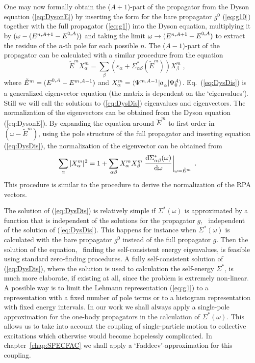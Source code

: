 One may now formally obtain the ($A+1$)-part of the propagator from the Dyson 
equation (\ref{eq:DysonE}) by
inserting the form for the bare propagator $g^0$ (\ref{eq:g10}) together with
the full
propagator (\ref{eq:g1}) into the Dyson equation, multiplying it by
$(\omega - (E^{n,A+1}- \EnulA))$ and taking the limit 
$\omega \rightarrow (E^{n,A+1}- \EnulA)$ to extract the residue of the $n$-th
pole for each possible $n$.
The ($A-1$)-part of the propagator can be calculated with a similar procedure
from the equation
%
	\begin{equation}
		\tilde{E}^m  
		X_\alpha^m
	=
		\sum_\beta
		\left(
			\varepsilon_\alpha +
			\Sigma^\ast_{\alpha\beta}(\tilde{E}^m)
		\right)
		X_\beta^m
	\label{eq:DysDis}
	\;,
	\end{equation}
%
where $\tilde{E}^m = (\EnulA - E^{m,A-1})$ and 
$X_\alpha^m=\ME<\Psi^{m,A-1}| \Oa{\alpha} | \Psi^A_0 >$. 
Eq.~(\ref{eq:DysDis}) is a generalized eigenvector equation 
(the matrix is dependent on the `eigenvalues'). Still we will call the 
solutions to (\ref{eq:DysDis}) eigenvalues and eigenvectors.
The normalization of the eigenvectors can be obtained from the Dyson
equation (\ref{eq:DysonE}). By expanding
the equation  around $\tilde{E}^m$ to first
order in $(\omega-\tilde{E}^m)$, using the pole structure of the full 
propagator and  inserting equation (\ref{eq:DysDis}), the normalization of
the eigenvector can be obtained from
%
	\begin{equation}
		\sum_\alpha
		|X_\alpha^m| ^2
	=
		1 
	+
		\sum_{\alpha\beta}
		X_\alpha^m
		X_\beta^m
		\left.
			\frac{ {\rm d} \Sigma^\ast_{\alpha\beta}(\omega)}
			     { {\rm d} \omega}
		\right|_{\omega = \tilde{E}^m}
	\label{eq:DysNorm}
	\;.
	\end{equation}
%
This procedure is similar to the procedure to derive the normalization of the
RPA vectors\cite{AEG93,HDA86}.

The solution of (\ref{eq:DysDis}) is relatively simple if 
$\Sigma^\ast(\omega)$ is approximated by a function that is independent of 
the solutions for the propagator $g$, \ie\ independent of the solution of
(\ref{eq:DysDis}). This happens for instance when 
$\Sigma^\ast(\omega)$ is calculated with the bare propagator $g^0$ instead of 
the 
full propagator $g$. Then the solution of the equation, \ie\ finding the 
self-consistent energy eigenvalues, is feasible\cite{BRM91} 
using standard zero-finding procedures.
A fully self-consistent solution of (\ref{eq:DysDis}), where the solution
is used to calculation the self-energy $\Sigma^\ast$, is much more 
elaborate, if existing at all, since the problem is extremely non-linear.
A possible way is to limit the Lehmann representation (\ref{eq:g1}) 
to a representation with a fixed number of pole terms\cite{MS93} or to a
histogram representation with 
fixed energy intervals\cite{NWR91}. In our work we shall always apply a 
single-pole approximation for the one-body propagators in the calculation of 
$\Sigma^\ast(\omega)$. This allows us to take into account the coupling of 
single-particle motion to collective excitations\cite{Rij93} which otherwise would become hopelessly complicated. In chapter~\ref{chap:SPECFAC} we shall 
apply a `Faddeev'-approximation for this coupling\cite{RGAD95}.

